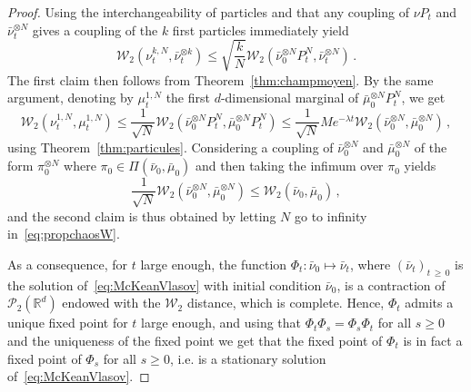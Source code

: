 \documentclass[AHL,Unicode,longabstracts,published]{cedram}
\newcommand{\R}{\mathbb R}
\newcommand{\clP}{\mathcal P}
\newcommand{\clW}{\mathcal W}
\newcommand{\1}{\mathbbm{1}}
\newcommand{\R}{\mathbb R}
\newcommand{\clW}{\mathcal W}
\begin{document}
\begin{proof}
Using the interchangeability of particles and that any coupling of $\nu P_t$ and $\bar \nu_t^{\otimes N}$ gives a coupling of the $k$ first particles immediately yield
\[
\clW_2\left( \nu_t^{k,N},\bar \nu_t^{\otimes k}\right) \leqslant \sqrt{\frac kN}\clW_2\left( \bar \nu_0^{\otimes N} P_t^N,\bar \nu_t^{\otimes N}\right)\,.
\]
The first claim then follows from Theorem~\ref{thm:champmoyen}. By the same argument, denoting by $\mu_t^{1,N}$ the first $d$-dimensional marginal of $\bar \mu_0^{\otimes N} P_t^N$, we get
\begin{equation}\label{eq:propchaosW}
\clW_2\left( \nu_t^{1,N},\mu_t^{1,N}\right) \leqslant \frac1{\sqrt N} \clW_2\left( \bar \nu_0^{\otimes N} P_t^N,\bar \mu_0^{\otimes N} P_t^N\right) \leqslant \frac1{\sqrt N} M e^{-\lambda t}\clW_2\left( \bar \nu_0^{\otimes N},\bar \mu_0^{\otimes N}\right)\,,
\end{equation}
using Theorem~\ref{thm:particules}. Considering a coupling of $\bar \nu_0^{\otimes N}$ and $\bar \mu_0^{\otimes N}$ of the form $\pi_0^{\otimes N}$ where $\pi_0 \in \Pi(\bar \nu_0,\bar \mu_0)$ and then taking the infimum over $\pi_0$ yields
\[
\frac{1}{\sqrt N}\clW_2\left(\bar \nu_0^{\otimes N},\bar \mu_0^{\otimes N}\right) \leqslant \clW_2\left( \bar \nu_0,\bar \mu_0\right)\,,
\]
and the second claim is thus obtained by letting $N$ go to infinity in~\eqref{eq:propchaosW}.

As a consequence, for $t$ large enough, the function $\Phi_t:\bar \nu_0 \mapsto \bar \nu_t$, where $(\bar \nu_t)_{t\,\geqslant\,0}$ is the solution of~\eqref{eq:McKeanVlasov} with initial condition $\bar\nu_0$, is a contraction of $\clP_2(\R^d)$ endowed with the $\clW_2$ distance, which is complete. Hence, $\Phi_t$ admits a unique fixed point for $t$ large enough, and using that $\Phi_t \Phi_s= \Phi_s \Phi_t$ for all $s\geqslant 0$ and the uniqueness of the fixed point we get that the fixed point of $\Phi_t$ is in fact a fixed point of $\Phi_s$ for all $s\geqslant 0$, i.e. is a stationary solution of~\eqref{eq:McKeanVlasov}.


\end{proof}
\end{document}
